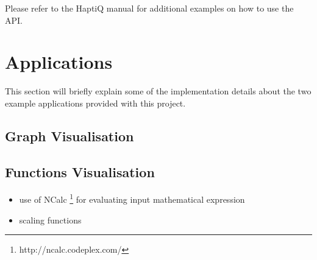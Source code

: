 
Please refer to the HaptiQ manual for additional examples on how to use the API. 


\section{Applications}
\label{sec:Applications}

This section will briefly explain some of the implementation details about the two example applications provided with this project.

\subsection{Graph Visualisation}

\subsection{Functions Visualisation}

\begin{itemize}
\item use of NCalc \footnote{http://ncalc.codeplex.com/} for evaluating input mathematical expression
\item scaling functions
\end{itemize}




